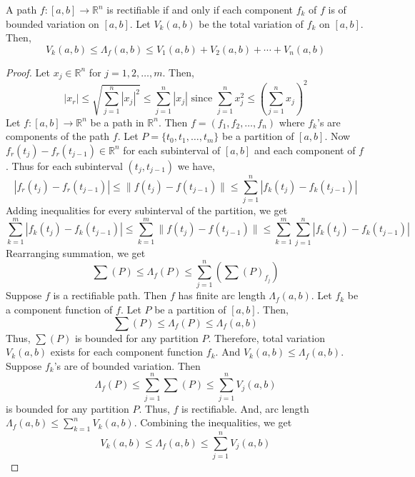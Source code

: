 \begin{theorem}
	A path $f : [a,b] \to \mathbb{R}^n$ is rectifiable if and only if each component $f_k$ of $f$ is of bounded variation on $[a,b]$.
	Let $V_k(a,b)$ be the total variation of $f_k$ on $[a,b]$.
	Then,
	\[ V_k(a,b) \le \Lambda_f(a,b) \le V_1(a,b) + V_2(a,b) + \dotsb + V_n(a,b) \]
\end{theorem}
\begin{proof}
	Let $x_j \in \mathbb{R}^n$ for $j = 1,2,\dots,m$.
	Then,
	\[ |x_r| \le \sqrt{\sum_{j=1}^n |x_j|^2} \le \sum_{j=1}^n |x_j| \text{ since } \sum_{j=1}^n x_j^2 \le \left(\sum_{j=1}^n x_j\right)^2 \]
	Let $f : [a,b] \to \mathbb{R}^n$ be a path in $\mathbb{R}^n$.
	Then $f = (f_1,f_2,\dots,f_n)$ where $f_k$'s are components of the path $f$.
	Let $P = \{ t_0,t_1,\dots,t_m \}$ be a partition of $[a,b]$.
	Now $f_r(t_j)-f_r(t_{j-1}) \in \mathbb{R}^n$ for each subinterval of $[a,b]$ and each component of $f$.
	Thus for each subinterval $(t_j,t_{j-1})$ we have,
	\[ |f_r(t_j)-f_r(t_{j-1})| \le \| f(t_j)-f(t_{j-1}) \| \le \sum_{j=1}^n |f_k(t_j)-f_k(t_{j-1})| \] 
	Adding inequalities for every subinterval of the partition, we get
	\[ \sum_{k=1}^m |f_k(t_j)-f_k(t_{j-1})| \le \sum_{k=1}^m \| f(t_j)-f(t_{j-1}) \| \le \sum_{k=1}^m \sum_{j=1}^n |f_k(t_j)-f_k(t_{j-1})| \] 
	Rearranging summation, we get
	\[ \sum (P) \le \Lambda_f (P) \le \sum_{j=1}^n \left( \sum (P)_{f_j} \right) \] 
	Suppose $f$ is a rectifiable path.
	Then $f$ has finite arc length $\Lambda_f (a,b)$.
	Let $f_k$ be a component function of $f$.
	Let $P$ be a partition of $[a,b]$.
	Then,
	\[ \sum (P) \le \Lambda_f(P) \le \Lambda_f (a,b) \]
	Thus, $\sum (P)$ is bounded for any partition $P$.
	Therefore, total variation $V_k(a,b)$ exists for each component function $f_k$.
	And $V_k(a,b) \le \Lambda_f(a,b)$.\\

	Suppose $f_k$'s are of bounded variation.
	Then \[ \Lambda_f(P) \le \sum_{j=1}^n \sum (P) \le \sum_{j=1}^n V_j(a,b) \] is bounded for any partition $P$.
	Thus, $f$ is rectifiable.
	And, arc length $\displaystyle \Lambda_f(a,b) \le \sum_{k=1}^n V_k (a,b)$.
	Combining the inequalities, we get
	\[ V_k(a,b) \le \Lambda_f(a,b) \le \sum_{j=1}^n V_j (a,b) \]
\end{proof}
